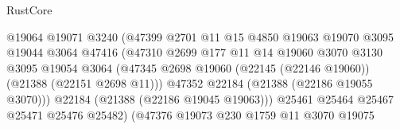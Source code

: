\begin{lexlean}{RustCore}
\begin{coremodule}
                                            @19064
                                            @19071
                                            @3240
                                            (@47399
                                              @2701
                                              @11
                                              @15
                                              @4850
                                              @19063
                                              @19070
                                              @3095
                                              @19044
                                              @3064
                                              @47416
                                              (@47310
                                                @2699
                                                @177
                                                @11
                                                @14
                                                @19060
                                                @3070
                                                @3130
                                                @3095
                                                @19054
                                                @3064
                                                (@47345
                                                  @2698
                                                  @19060
                                                  (@22145 (@22146 @19060))
                                                  (@21388 (@22151 @2698 @11)))
                                                @47352
                                                @22184
                                                (@21388 (@22186 @19055 @3070)))
                                              @22184
                                              (@21388 (@22186 @19045 @19063)))
                                            @25461
                                            @25464
                                            @25467
                                            @25471
                                            @25476
                                            @25482)
                                          (@47376
                                            @19073
                                            @230
                                            @1759
                                            @11
                                            @3070
                                            @19075

\end{coremodule}
\end{lexlean}
